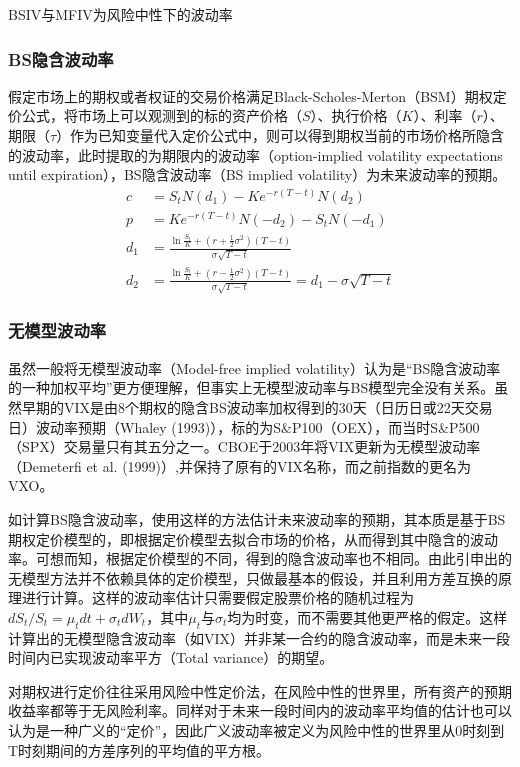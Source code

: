 \documentclass[11pt]{article}
\begin{document}
BSIV与MFIV为风险中性下的波动率

\subsubsection{BS隐含波动率}

假定市场上的期权或者权证的交易价格满足Black-Scholes-Merton（BSM）期权定价公式，将市场上可以观测到的标的资产价格（$S$）、执行价格（$K$）、利率（$r$）、期限（$\tau$）作为已知变量代入定价公式中，则可以得到期权当前的市场价格所隐含的波动率，此时提取的为期限内的波动率（option-implied volatility expectations until expiration），BS隐含波动率（BS implied volatility）为未来波动率的预期。
\begin{align*}
    c &= S_t N(d_1) - Ke^{-r(T-t)} N(d_2) \\
    p & = K e^{-r(T-t)}N(-d_2) - S_t N(-d_1) \\
    d_1 &= \frac{\ln \frac{S_t}{K} + (r+\frac{1}{2}\sigma^2)(T-t)}{\sigma\sqrt{T-t}} \\
    d_2 &= \frac{\ln \frac{S_t}{K} + (r-\frac{1}{2}\sigma^2)(T-t)}{\sigma\sqrt{T-t}} = d_1 - \sigma\sqrt{T-t}
\end{align*}

\subsubsection{无模型波动率}

虽然一般将无模型波动率（Model-free implied volatility）认为是“BS隐含波动率的一种加权平均”更方便理解，但事实上无模型波动率与BS模型完全没有关系。虽然早期的VIX是由8个期权的隐含BS波动率加权得到的30天（日历日或22天交易日）波动率预期（Whaley (1993)），标的为S\&P100（OEX），而当时S\&P500（SPX）交易量只有其五分之一。CBOE于2003年将VIX更新为无模型波动率（Demeterfi et al. (1999)）,并保持了原有的VIX名称，而之前指数的更名为VXO。

如计算BS隐含波动率，使用这样的方法估计未来波动率的预期，其本质是基于BS期权定价模型的，即根据定价模型去拟合市场的价格，从而得到其中隐含的波动率。可想而知，根据定价模型的不同，得到的隐含波动率也不相同。由此引申出的无模型方法并不依赖具体的定价模型，只做最基本的假设，并且利用方差互换的原理进行计算。这样的波动率估计只需要假定股票价格的随机过程为$dS_t/S_t =\mu_t dt + \sigma_t dW_t$，其中$\mu_t$与$\sigma_t$均为时变，而不需要其他更严格的假定。这样计算出的无模型隐含波动率（如VIX）并非某一合约的隐含波动率，而是未来一段时间内已实现波动率平方（Total variance）的期望。

对期权进行定价往往采用风险中性定价法，在风险中性的世界里，所有资产的预期收益率都等于无风险利率。同样对于未来一段时间内的波动率平均值的估计也可以认为是一种广义的“定价”，因此广义波动率被定义为风险中性的世界里从0时刻到T时刻期间的方差序列的平均值的平方根。
\end{document}
